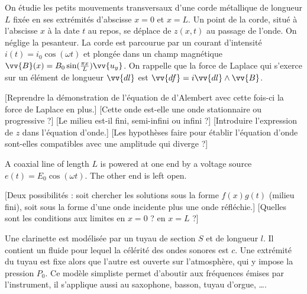 On étudie les petits mouvements transversaux d'une corde métallique de longueur $L$ fixée en ses extrémités d'abscisse $x=0$ et $x=L$. Un point de la corde, situé à l'abscisse $x$ à la date $t$ au repos, se déplace de $z(x,t)$ au passage de l'onde. On néglige la pesanteur. La corde est parcourue par un courant d'intensité $i(t)=i_0\cos(\omega t)$ et plongée dans un champ magnétique $\vv{B}(x)=B_0\sin(\frac{\pi x}{L})\vv{u_y}$. On rappelle que la force de Laplace qui s'exerce sur un élément de longueur $\vv{dl}$ est $\vv{df}=i\vv{dl}\wedge\vv{B}$.
\begin{enumerate}
    [Reprendre la démonstration de l'équation de d'Alembert avec cette fois-ci la force de Laplace en plus.]
    [Cette onde est-elle une onde stationnaire ou progressive ?]
    [Le milieu est-il fini, semi-infini ou infini ?]
    [Introduire l'expression de $z$ dans l'équation d'onde.]
    [Les hypothèses faire pour établir l'équation d'onde sont-elles compatibles avec une amplitude qui diverge ?]
\end{enumerate}

A coaxial line of length $L$ is powered at one end by a voltage source $e(t)=E_0\cos(\omega t)$. The other end is left open.
\begin{enumerate}
    [Deux possibilités : soit chercher les solutions sous la forme $f(x)g(t)$ (milieu fini), soit sous la forme d'une onde incidente plus une onde réfléchie.]
    [Quelles sont les conditions aux limites en $x=0$ ? en $x=L$ ?]
\end{enumerate}


Une clarinette est modélisée par un tuyau de section $S$ et de longueur $l$. Il contient un fluide pour lequel la célérité des ondes sonores est $c$. Une extrémité du tuyau est fixe alors que l'autre est ouverte sur l'atmosphère, qui y impose la pression $P_0$. Ce modèle simpliste permet d'aboutir aux fréquences émises par l'instrument, il s'applique aussi au saxophone, basson, tuyau d'orgue, \dots{}.
\begin{figure}[!ht]
  \centering
  
\end{figure}

